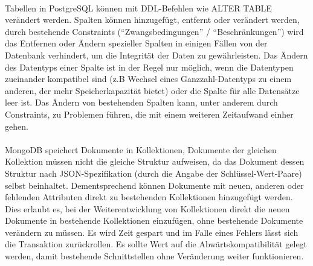 \paragraph{}
Tabellen in PostgreSQL können mit DDL-Befehlen wie ALTER TABLE verändert werden. %
Spalten können hinzugefügt, entfernt oder verändert werden, durch bestehende Constraints (\enquote{Zwangsbedingungen} / \enquote{Beschränkungen}) wird das Entfernen oder Ändern spezieller Spalten in einigen Fällen von der Datenbank verhindert, um die Integrität der Daten zu gewährleisten. 
Das Ändern des Datentyps einer Spalte ist in der Regel nur möglich, wenn die Datentypen zueinander kompatibel sind (z.B Wechsel eines Ganzzahl-Datentyps zu einem anderen, der mehr Speicherkapazität bietet) oder die Spalte für alle Datensätze leer ist.
Das Ändern von bestehenden Spalten kann, unter anderem durch Constraints, zu Problemen führen, die mit einem weiteren Zeitaufwand einher gehen.

\paragraph{}
MongoDB speichert Dokumente in Kollektionen, Dokumente der gleichen Kollektion müssen nicht die gleiche Struktur aufweisen, da das Dokument dessen Struktur nach JSON-Spezifikation (durch die Angabe der Schlüssel-Wert-Paare) selbst beinhaltet. %
Dem\-entsprechend können Dokumente mit neuen, anderen oder fehlenden Attributen direkt zu bestehenden Kollektionen hinzugefügt werden.
Dies erlaubt es, bei der Weiterentwicklung von Kollektionen direkt die neuen Dokumente in bestehende Kollektionen einzufügen, ohne bestehende Dokumente verändern zu müssen.
Es wird Zeit gespart und im Falle eines Fehlers lässt sich die Transaktion zurückrollen.
Es sollte Wert auf die Abwärtskompatibilität gelegt werden, damit bestehende Schnittstellen ohne Veränderung weiter funktionieren.


